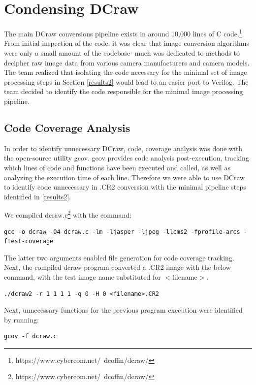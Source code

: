 \documentclass{report}
\begin{document}
\chapter{Condensing DCraw}
\label{dcraw}

The main DCraw conversions pipeline exists in around 10,000 lines of C code.\footnote{https://www.cybercom.net/~dcoffin/dcraw/}. From initial inspection of the code, it was clear that image conversion algorithms were only a small amount of the codebase- much was dedicated to methods to decipher raw image data from various camera manufacturers and camera models. The team realized that isolating the code necessary for the minimal set of image processing steps in Section \ref{results2} would lead to an easier port to Verilog. The team decided to identify the code responsible for the minimal image processing pipeline.

\section{Code Coverage Analysis}
In order to identify unnecessary DCraw, code, coverage analysis was done with the open-source utility gcov. gcov provides code analysis post-execution, tracking which lines of code and functions have been executed and called, as well as analyzing the execution time of each line. Therefore we were able to use DCraw to identify code unnecessary in .CR2 conversion with the minimal pipeline steps identified in \ref{results2}.

We compiled dcraw.c\footnote{https://www.cybercom.net/~dcoffin/dcraw/} with the command:

\begin{verbatim}
gcc -o dcraw -O4 dcraw.c -lm -ljasper -ljpeg -llcms2 -fprofile-arcs -ftest-coverage
\end{verbatim}

The latter two arguments enabled file generation for code coverage tracking. Next, the compiled dcraw program converted a .CR2 image with the below command, with the test image name substituted for $<$filename$>$.

\begin{verbatim}
./dcraw2 -r 1 1 1 1 -q 0 -H 0 <filename>.CR2
\end{verbatim}

Next, unnecessary functions for the previous program execution were identified by running:

\begin{verbatim}
gcov -f dcraw.c
\end{verbatim}
\end{document}
